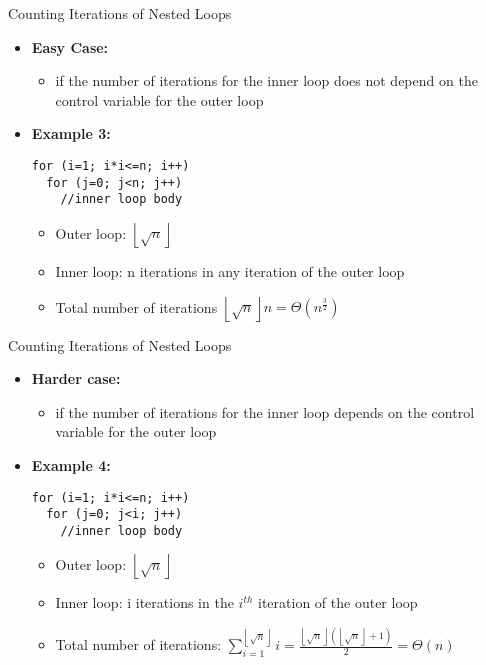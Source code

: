 \item Counting Iterations of Nested Loops
  \begin{itemize}
  \item \textbf{Easy Case:}
    \begin{itemize}
    \item if the number of iterations for the inner loop does not depend on the control variable for the outer loop
    \end{itemize}
  \item \textbf{Example 3:}
\begin{lstlisting}
for (i=1; i*i<=n; i++)
  for (j=0; j<n; j++)
    //inner loop body
\end{lstlisting}
    \begin{itemize}
    \item Outer loop: $\left\lfloor\sqrt{n}\right\rfloor$
    \item Inner loop: n iterations in any iteration of the outer loop
    \item Total number of iterations $\left\lfloor\sqrt{n}\right\rfloor n=\Theta\left(n^{\frac{3}{2}}\right)$
    \end{itemize}
  \end{itemize}
\item Counting Iterations of Nested Loops
  \begin{itemize}
  \item \textbf{Harder case:}
    \begin{itemize}
    \item if the number of iterations for the inner loop depends on the control variable for the outer loop
    \end{itemize}
  \item \textbf{Example 4:}
\begin{lstlisting}
for (i=1; i*i<=n; i++)
  for (j=0; j<i; j++)
    //inner loop body
\end{lstlisting}
    \begin{itemize}
    \item Outer loop: $\left\lfloor\sqrt{n}\right\rfloor$
    \item Inner loop: i iterations in the $i^{th}$ iteration of the outer loop
    \item Total number of iterations: $ \displaystyle \sum\limits_{i=1}^{\left\lfloor\sqrt{n}\right\rfloor}i=\frac{\left\lfloor\sqrt{n}\right\rfloor\left(\left\lfloor\sqrt{n}\right\rfloor+1\right)}{2}=\Theta (n)$
    \end{itemize}
  \end{itemize}
